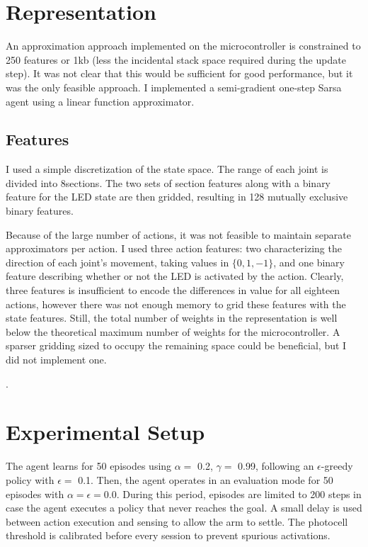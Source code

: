 \documentclass{article}
\begin{document}
		
	\section{Representation}
	
	An approximation approach implemented on the microcontroller is constrained to 250 features or 1kb (less the incidental stack space required during the update step). It was not clear that this would be sufficient for good performance, but it was the only feasible approach. I implemented a semi-gradient one-step Sarsa agent using a linear function approximator.
	
	\subsection{Features}
	
	I used a simple discretization of the state space. The range of each joint is divided into 8\space{}\degree\space sections. The two sets of section features along with a binary feature for the LED state are then gridded, resulting in 128 mutually exclusive binary features. 
	
	Because of the large number of actions, it was not feasible to maintain separate approximators per action. I used three action features: two characterizing the direction of each joint's movement, taking values in $\{0, 1, -1\}$, and one binary feature describing whether or not the LED is activated by the action. Clearly, three features is insufficient to encode the differences in value for all eighteen actions, however there was not enough memory to grid these features with the state features. Still, the total number of weights in the representation is well below the theoretical maximum number of weights for the microcontroller. A sparser gridding sized to occupy the remaining space could be beneficial, but I did not implement one.
		
.

	
	
	\section{Experimental Setup}
	

	The agent learns for 50 episodes using $\alpha =$ 0.2, $\gamma =$ 0.99,  following an $\epsilon$-greedy policy with $\epsilon=$ 0.1. Then, the agent operates in an evaluation mode for 50 episodes with $\alpha=\epsilon=0.0$. During this period, episodes are limited to 200 steps in case the agent executes a policy that never reaches the goal. A small delay is used between action execution and sensing to allow the arm to settle. The photocell threshold is calibrated before every session to prevent spurious activations.
\end{document}
